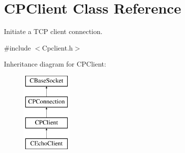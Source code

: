 \hypertarget{class_c_p_client}{\section{\-C\-P\-Client \-Class \-Reference}
\label{class_c_p_client}
}


\-Initiate a \-T\-C\-P client connection.  




{\ttfamily \#include $<$\-Cpclient.\-h$>$}

\-Inheritance diagram for \-C\-P\-Client\-:\begin{figure}[H]
\begin{center}
\leavevmode
\includegraphics[height=4.000000cm]{class_c_p_client}
\end{center}
\end{figure}
